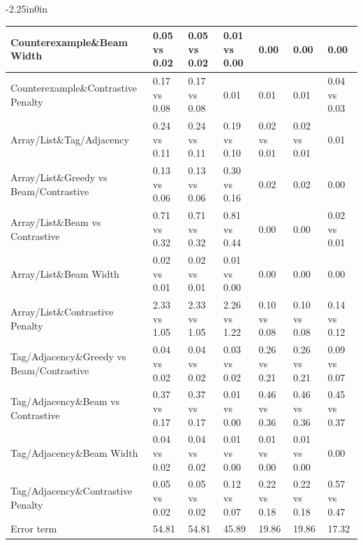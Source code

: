 \begin{table}[h]
\begin{adjustwidth}{-2.25in}{0in}
{\begin{tabular}{|l|lll|lll|}
\hline
Counterexample\&Beam Width & 0.05 vs 0.02 & 0.05 vs 0.02 & 0.01 vs 0.00 & 0.00 & 0.00 & 0.00 \\
\hline
Counterexample\&Contrastive Penalty & 0.17 vs 0.08 & 0.17 vs 0.08 & 0.01 & 0.01 & 0.01 & 0.04 vs 0.03 \\
\hline
Array/List\&Tag/Adjacency & 0.24 vs 0.11 & 0.24 vs 0.11 & 0.19 vs 0.10 & 0.02 vs 0.01 & 0.02 vs 0.01 & 0.01 \\
\hline
Array/List\&Greedy vs Beam/Contrastive & 0.13 vs 0.06 & 0.13 vs 0.06 & 0.30 vs 0.16 & 0.02 & 0.02 & 0.00 \\
\hline
Array/List\&Beam vs Contrastive & 0.71 vs 0.32 & 0.71 vs 0.32 & 0.81 vs 0.44 & 0.00 & 0.00 & 0.02 vs 0.01 \\
\hline
Array/List\&Beam Width & 0.02 vs 0.01 & 0.02 vs 0.01 & 0.01 vs 0.00 & 0.00 & 0.00 & 0.00 \\
\hline
Array/List\&Contrastive Penalty & 2.33 vs 1.05 & 2.33 vs 1.05 & 2.26 vs 1.22 & 0.10 vs 0.08 & 0.10 vs 0.08 & 0.14 vs 0.12 \\
\hline
Tag/Adjacency\&Greedy vs Beam/Contrastive & 0.04 vs 0.02 & 0.04 vs 0.02 & 0.03 vs 0.02 & 0.26 vs 0.21 & 0.26 vs 0.21 & 0.09 vs 0.07 \\
\hline
Tag/Adjacency\&Beam vs Contrastive & 0.37 vs 0.17 & 0.37 vs 0.17 & 0.01 vs 0.00 & 0.46 vs 0.36 & 0.46 vs 0.36 & 0.45 vs 0.37 \\
\hline
Tag/Adjacency\&Beam Width & 0.04 vs 0.02 & 0.04 vs 0.02 & 0.01 vs 0.00 & 0.01 vs 0.00 & 0.01 vs 0.00 & 0.00 \\
\hline
Tag/Adjacency\&Contrastive Penalty & 0.05 vs 0.02 & 0.05 vs 0.02 & 0.12 vs 0.07 & 0.22 vs 0.18 & 0.22 vs 0.18 & 0.57 vs 0.47 \\
\hline
\cellcolor[HTML]{FDE9D9}Error term & 54.81 & 54.81 & 45.89 & 19.86 & 19.86 & 17.32 \\
\hline
\end{tabular}
}
\label{table:algo1_variance_decomposition}
\end{adjustwidth}
\end{table}

